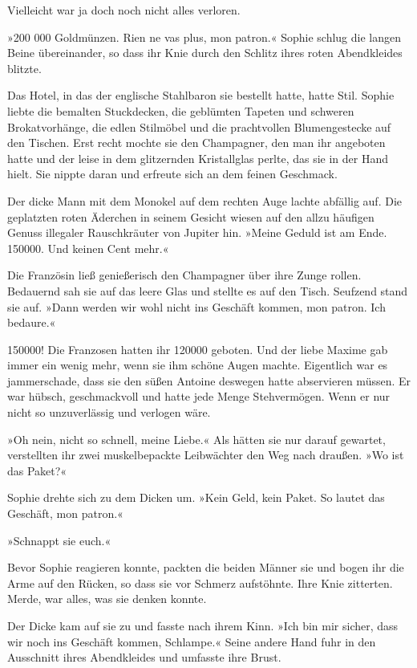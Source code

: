 Vielleicht war ja doch noch nicht alles verloren.

\tb

»200 000 Goldmünzen. Rien ne vas plus, mon patron.« Sophie schlug
die langen Beine übereinander, so dass ihr Knie durch den Schlitz
ihres roten Abendkleides blitzte.

Das Hotel, in das der englische Stahlbaron sie bestellt hatte,
hatte Stil. Sophie liebte die bemalten Stuckdecken, die geblümten
Tapeten und schweren Brokatvorhänge, die edlen Stilmöbel und die
prachtvollen Blumengestecke auf den Tischen. Erst recht mochte sie
den Champagner, den man ihr angeboten hatte und der leise in dem
glitzernden Kristallglas perlte, das sie in der Hand hielt. Sie
nippte daran und erfreute sich an dem feinen Geschmack.

Der dicke Mann mit dem Monokel auf dem rechten Auge lachte abfällig
auf. Die geplatzten roten Äderchen in seinem Gesicht wiesen auf den
allzu häufigen Genuss illegaler Rauschkräuter von Jupiter hin.
»Meine Geduld ist am Ende. 150000. Und keinen Cent mehr.«

Die Französin ließ genießerisch den Champagner über ihre Zunge
rollen. Bedauernd sah sie auf das leere Glas und stellte es auf den
Tisch. Seufzend stand sie auf. »Dann werden wir wohl nicht ins
Geschäft kommen, mon patron. Ich bedaure.«

150000! Die Franzosen hatten ihr 120000 geboten. Und der liebe
Maxime gab immer ein wenig mehr, wenn sie ihm schöne Augen machte.
Eigentlich war es jammerschade, dass sie den süßen Antoine deswegen
hatte abservieren müssen. Er war hübsch, geschmackvoll und hatte
jede Menge Stehvermögen. Wenn er nur nicht so unzuverlässig und
verlogen wäre.

»Oh nein, nicht so schnell, meine Liebe.« Als hätten sie nur darauf
gewartet, verstellten ihr zwei muskelbepackte Leibwächter den Weg
nach draußen. »Wo ist das Paket?«

Sophie drehte sich zu dem Dicken um. »Kein Geld, kein Paket. So
lautet das Geschäft, mon patron.«

»Schnappt sie euch.«

Bevor Sophie reagieren konnte, packten die beiden Männer sie und
bogen ihr die Arme auf den Rücken, so dass sie vor Schmerz
aufstöhnte. Ihre Knie zitterten. Merde, war alles, was sie denken
konnte.

Der Dicke kam auf sie zu und fasste nach ihrem Kinn. »Ich bin mir
sicher, dass wir noch ins Geschäft kommen, Schlampe.« Seine andere
Hand fuhr in den Ausschnitt ihres Abendkleides und umfasste ihre
Brust.


